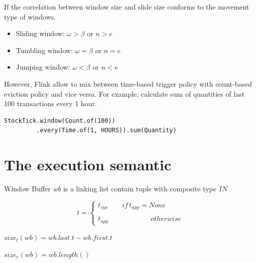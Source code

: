 If the correlation between window size and slide size  conforms to the movement type of windows.
\begin{itemize}
\item Sliding window: $\omega > \beta$ or $n > e$
\item Tumbling window: $\omega = \beta$ or $n = e$
\item Jumping window: $\omega < \beta$ or $n < e$
\end{itemize}

However, Flink allow to mix between time-based trigger policy with count-based eviction policy and vice versa. For example,
calculate sum of quantities of last 100 transactions every 1 hour.
\begin{verbatim}
StockTick.window(Count.of(100))
		 .every(Time.of(1, HOURS)).sum(Quantity)
\end{verbatim}

\section{The execution semantic}

%
%
%
%
%

Window Buffer \textit{wb} is a linking list contain tuple with composite type $IN$



\begin{equation}
	t = 
	\begin{cases}
		t_{sys} \qquad if\,t_{app} = None\\
		   \\
		t_{app} \qquad\qquad\qquad otherwise
	\end{cases}
\end{equation}

$size_{t}(wb) = wb.last.t - wb.first.t$

$size_c(wb) = wb.length()$


